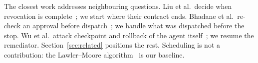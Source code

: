 The closest work addresses neighbouring questions. Liu et al.\ decide when revocation is complete~\cite{liu2026revocation}; we start where their contract ends. Bhadane et al.\ re-check an approval before dispatch~\cite{bhadane2026runtime}; we handle what was dispatched before the stop. Wu et al.\ attack checkpoint and rollback of the agent itself~\cite{wu2026safe}; we resume the remediator. Section~\ref{sec:related} positions the rest. Scheduling is not a contribution: the Lawler--Moore algorithm~\cite{lawler1969functional} is our baseline.
